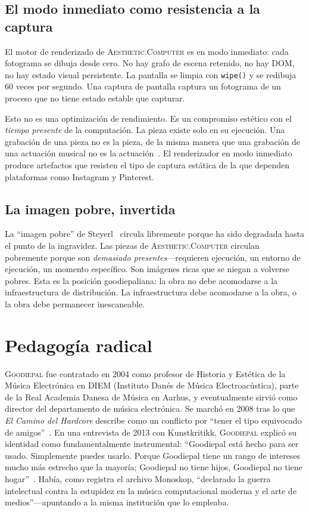 \documentclass[10pt,letterpaper,twocolumn]{article}
\newcommand{\ac}{\textsc{Aesthetic.Computer}}
\newcommand{\gp}{\textsc{Goodiepal}}
\begin{document}
\subsection{El modo inmediato como resistencia a la captura}

El motor de renderizado de \ac{} es en modo inmediato: cada fotograma se dibuja desde cero. No hay grafo de escena retenido, no hay DOM, no hay estado visual persistente. La pantalla se limpia con \texttt{wipe()} y se redibuja 60 veces por segundo. Una captura de pantalla captura un fotograma de un proceso que no tiene estado estable que capturar.

Esto no es una optimización de rendimiento. Es un compromiso estético con el \emph{tiempo presente} de la computación. La pieza existe solo en su ejecución. Una grabación de una pieza no es la pieza, de la misma manera que una grabación de una actuación musical no es la actuación~\citep{magnusson2010designing}. El renderizador en modo inmediato produce artefactos que resisten el tipo de captura estática de la que dependen plataformas como Instagram y Pinterest.

\subsection{La imagen pobre, invertida}

La ``imagen pobre'' de Steyerl~\citep{steyerl2009defense} circula libremente porque ha sido degradada hasta el punto de la ingravidez. Las piezas de \ac{} circulan pobremente porque son \emph{demasiado presentes}---requieren ejecución, un entorno de ejecución, un momento específico. Son imágenes ricas que se niegan a volverse pobres. Esta es la posición goodiepaliana: la obra no debe acomodarse a la infraestructura de distribución. La infraestructura debe acomodarse a la obra, o la obra debe permanecer inescaneable.

\section{Pedagogía radical}

\gp{} fue contratado en 2004 como profesor de Historia y Estética de la Música Electrónica en DIEM (Instituto Danés de Música Electroacústica), parte de la Real Academia Danesa de Música en Aarhus, y eventualmente sirvió como director del departamento de música electrónica. Se marchó en 2008 tras lo que \emph{El Camino del Hardcore} describe como un conflicto por ``tener el tipo equivocado de amigos''~\citep{goodiepal2012elcamino}. En una entrevista de 2013 con Kunstkritikk, \gp{} explicó su identidad como fundamentalmente instrumental: ``Goodiepal está hecho para ser usado. Simplemente puedes usarlo. Porque Goodiepal tiene un rango de intereses mucho más estrecho que la mayoría; Goodiepal no tiene hijos, Goodiepal no tiene hogar''~\citep{kunstkritikk2013goodiepal}. Había, como registra el archivo Monoskop, ``declarado la guerra intelectual contra la estupidez en la música computacional moderna y el arte de medios''---apuntando a la misma institución que lo empleaba.
\end{document}
